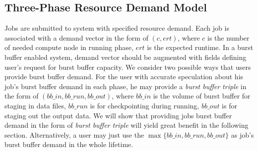 \subsection{Three-Phase Resource Demand Model}

Jobs are submitted to system with specified resource demand. 
Each job is associated with a demand vector in the form of $(c, ert)$, 
where $c$ is the number of needed compute node in running phase,
$ert$ is the expected runtime. 
In a burst buffer enabled system, demand vector should be augmented
with fields defining user's request for burst buffer capacity.
We consider two possible ways that users provide burst buffer demand.
For the user with accurate speculation about his job's burst buffer demand in each phase,
he may provide a \textit{burst buffer triple} in the form of $(bb\_in, bb\_run, bb\_out)$,
where $bb\_in$ is the volume of burst buffer for staging in data files,
$bb\_run$ is for checkpointing during running,
$bb\_out$ is for staging out the output data.
We will show that providing jobs burst buffer demand in the form of \textit{burst buffer triple} 
will yield great benefit in the following section.
Alternatively, a user may just use the $\max\{bb\_in, bb\_run, bb\_out\}$ 
as job's burst buffer demand in the whole lifetime. 

